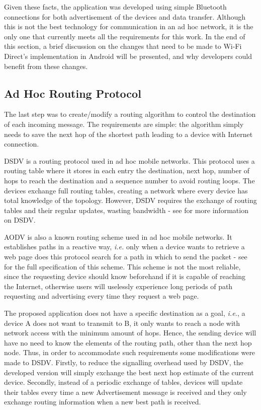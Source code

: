 Given these facts, the application was developed using simple Bluetooth connections for both advertisement of the devices and data transfer. Although this is not the best technology for communication in an ad hoc network, it is the only one that currently meets all the requirements for this work. In the end of this section, a brief discussion on the changes that need to be made to Wi-Fi Direct's implementation in Android will be presented, and why developers could benefit from these changes.

\subsection{Ad Hoc Routing Protocol}
\label{subsec:routprot}

The last step was to create/modify a routing algorithm to control the destination of each incoming message. The requirements are simple: the algorithm simply needs to save the next hop of the shortest path leading to a device with Internet connection.

\gls{DSDV} is a routing protocol used in ad hoc mobile networks. This protocol uses a routing table where it stores in each entry the destination, next hop, number of hops to reach the destination and a sequence number to avoid routing loops. The devices exchange full routing tables, creating a network where every device has total knowledge of the topology. However, \gls{DSDV} requires the exchange of routing tables and their regular updates, wasting bandwidth - see \cite{dsdv} for more information on \gls{DSDV}.

\gls{AODV} is also a known routing scheme used in ad hoc mobile networks. It establishes paths in a reactive way, \textit{i.e.} only when a device wants to retrieve a web page does this protocol search for a path in which to send the packet - see \cite{aodv} for the full specification of this scheme. This scheme is not the most reliable, since the requesting device should know beforehand if it is capable of reaching the Internet, otherwise users will uselessly experience long periods of path requesting and advertising every time they request a web page.

The proposed application does not have a specific destination as a goal, \textit{i.e.}, a device A does not want to transmit to B, it only wants to reach a node with network access with the minimum amount of hops. Hence, the sending device will have no need to know the elements of the routing path, other than the next hop node. Thus, in order to accommodate such requirements some modifications were made to \gls{DSDV}. Firstly, to reduce the signalling overhead used by \gls{DSDV}, the developed version will simply exchange the best next hop estimate of the current device. Secondly, instead of a periodic exchange of tables, devices will update their tables every time a new Advertisement message is received and they only exchange routing information when a new best path is received.

